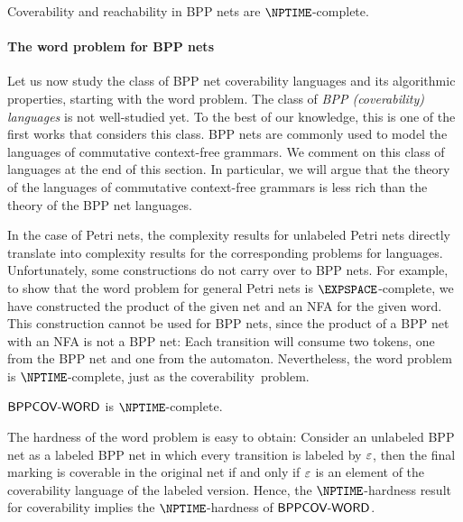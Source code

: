 \documentclass[../../diss.tex]{subfiles}
\begin{document}
\begin{corollary}
    Coverability and reachability in BPP nets are $\NPTIME$-complete.
\end{corollary}

\paragraph{The word problem for BPP nets}

Let us now study the class of BPP net coverability languages and its algorithmic properties, starting with the word problem.
The class of \emph{BPP (coverability) languages} is not well-studied yet.
To the best of our knowledge, this is one of the first works that considers this class.
BPP nets are commonly used to model the languages of commutative context-free grammars.
We comment on this class of languages at the end of this section.
In particular, we will argue that the theory of the languages of commutative context-free grammars is less rich than the theory of the BPP net languages.

\begin{problem}
    \problemshort{($\WORDBPPCOV$)}
\end{problem}

In the case of Petri nets, the complexity results for unlabeled Petri nets directly translate into complexity results for the corresponding problems for languages.
Unfortunately, some constructions do not carry over to BPP nets.
For example, to show that the word problem for general Petri nets is $\EXPSPACE$-complete, we have constructed the product of the given net and an NFA for the given word.
This construction cannot be used for BPP nets, since the product of a BPP net with an NFA is not a BPP net: Each transition will consume two tokens, one from the BPP net and one from the automaton.
Nevertheless, the word problem is $\NPTIME$-complete, just as the coverability~problem.

\begin{proposition}%
\label{Proposition:BPPWordProblem}%
    $\WORDBPPCOV$ is $\NPTIME$-complete.
\end{proposition}

The hardness of the word problem is easy to obtain: Consider an unlabeled BPP net as a labeled BPP net in which every transition is labeled by $\varepsilon$, then the final marking is coverable in the original net if and only if $\varepsilon$ is an element of the coverability language of the labeled version.
Hence, the $\NPTIME$-hardness result for coverability implies the $\NPTIME$-hardness of $\WORDBPPCOV$.
\end{document}
